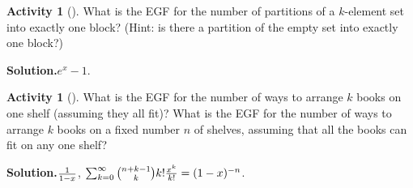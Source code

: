 \documentclass[10pt,]{book}
\theoremstyle{plain}
\theoremstyle{definition}
\newtheorem{activity}[project]{Activity}
\numberwithin{equation}{chapter}
\begin{document}
\begin{activity}[]\label{oneblockpartitions}
What is the EGF for the number of partitions of a \(k\)-element set into exactly one block? (Hint: is there a partition of the empty set into exactly one block?)%
\par\medskip\noindent%
\textbf{Solution.}\quad \(e^x-1\).%
\end{activity}
\begin{activity}[]\label{exponentialbookshelf}
What is the EGF for the number of ways to arrange \(k\) books on one shelf (assuming they all fit)? What is the EGF for the number of ways to arrange \(k\) books on a fixed number \(n\) of shelves, assuming that all the books can fit on any one shelf?%
\par\medskip\noindent%
\textbf{Solution.}\quad \(1\over 1-x\), \(\sum_{k=0}^\infty {n+k-1 \choose k}k!{x^k\over
k!} = (1-x)^{-n}\).%
\end{activity}
\typeout{************************************************}
\typeout{************************************************}
\end{document}
